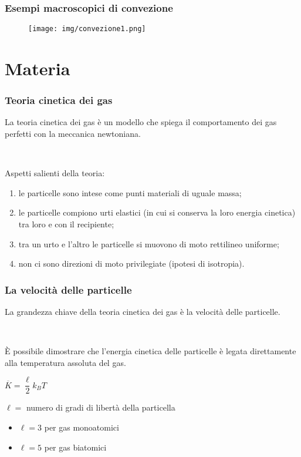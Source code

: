 \documentclass[]{beamer}
\theoremstyle{plain}
\begin{document}
\begin{frame}
\frametitle{Esempi macroscopici di convezione}
\begin{figure}
\texttt{[image: img/convezione1.png]}
\end{figure}
\end{frame}


\section{Materia}






\begin{frame}
\frametitle{Teoria cinetica dei gas}
La teoria cinetica dei gas è un modello che \alert<1>{spiega il comportamento dei gas perfetti con la meccanica newtoniana}.\pause

~

Aspetti salienti della teoria:
\begin{enumerate}
  \item \alert<2>{le particelle sono intese come punti} materiali di uguale massa;\pause
  \item le particelle compiono urti elastici (in cui \alert<3>{si conserva la loro energia cinetica}) tra loro e con il recipiente;\pause
  \item tra un urto e l'altro \alert<4>{le particelle si muovono di moto rettilineo uniforme};\pause
  \item non ci sono direzioni di moto privilegiate (ipotesi di \alert{isotropia}).
\end{enumerate}
\end{frame}




\begin{frame}
\frametitle{La velocità delle particelle}
La grandezza chiave della teoria cinetica dei gas è la velocità delle particelle.\pause

~

È possibile dimostrare che \alert{l'energia cinetica delle particelle è legata direttamente alla temperatura assoluta del gas}.
\begin{center}
\colorbox{marroncino!30}{$ \overline{K} = \dfrac{\ell}{2}k_B T $}
\end{center}
$ \ell = $ numero di gradi di libertà della particella
\begin{itemize}
  \item $ \ell = 3 $ per gas monoatomici
  \item$ \ell = 5 $ per gas biatomici
\end{itemize}
\end{frame}
\end{document}
